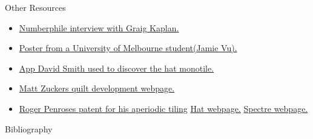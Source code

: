 \documentclass{beamer}
\begin{document}
\begin{frame}[allowframebreaks]{Other Resources}
    \begin{itemize}
        \item \href{https://www.youtube.com/watch?v=_ZS3Oqg1AX0&ab_channel=Numberphile}{Numberphile interview with Graig Kaplan.}
        \item \href{https://ms.unimelb.edu.au/__data/assets/pdf_file/0011/5218382/vujamie_296128_22162633_Jamie_Vu_Poster_final.pdf}{Poster from a University of Melbourne student(Jamie Vu).}
        \item \href{https://cs.uwaterloo.ca/~csk/spectre/app.html}{App David Smith used to discover the hat monotile.}
        \item \href{https://mzucker.github.io/2022/11/13/penrose-tiling-quilt.html}{Matt Zuckers quilt development webpage.}
        \item \href{https://patentimages.storage.googleapis.com/f2/9b/08/1b79cb4e4c0f3f/US4133152.pdf}{Roger Penroses patent for his aperiodic tiling}
        \href{https://cs.uwaterloo.ca/~csk/hat/}{Hat webpage.}
        \href{https://cs.uwaterloo.ca/~csk/spectre/}{Spectre webpage.}
    \end{itemize}
\end{frame}

    

\begin{frame}[allowframebreaks]{Bibliography}
  \footnotesize
  
  
\end{frame}





\end{document}
